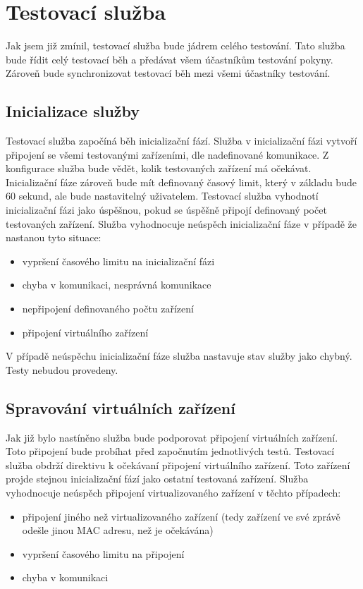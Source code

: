 \section{Testovací služba}
Jak jsem již zmínil, testovací služba bude jádrem celého testování. Tato služba bude řídit celý testovací běh a předávat všem účastníkům testování pokyny. Zároveň bude synchronizovat testovací běh mezi všemi účastníky testování. 

\subsection{Inicializace služby}
Testovací služba započíná běh inicializační fází. Služba v inicializační fázi vytvoří připojení se všemi testovanými zařízeními, dle nadefinované komunikace. Z konfigurace služba bude vědět, kolik testovaných zařízení má očekávat. Inicializační fáze zároveň bude mít definovaný časový limit, který v základu bude 60 sekund, ale bude nastavitelný uživatelem. Testovací služba vyhodnotí inicializační fázi jako úspěšnou, pokud se úspěšně připojí definovaný počet testovaných zařízení. Služba vyhodnocuje neúspěch inicializační fáze v případě že nastanou tyto situace:

\begin{itemize}
    \item vypršení časového limitu na inicializační fázi
    \item chyba v komunikaci, nesprávná komunikace
    \item nepřipojení definovaného počtu zařízení
    \item připojení virtuálního zařízení
\end{itemize}

V případě neúspěchu inicializační fáze služba nastavuje stav služby jako chybný. Testy nebudou provedeny.

\subsection{Spravování virtuálních zařízení}
Jak již bylo nastíněno služba bude podporovat připojení virtuálních zařízení. Toto připojení bude probíhat před započnutím jednotlivých testů. Testovací služba obdrží direktivu k očekávaní připojení virtuálního zařízení. Toto zařízení projde stejnou inicializační fází jako ostatní testovaná zařízení. Služba vyhodnocuje neúspěch připojení virtualizovaného zařízení v těchto případech:

\begin{itemize}
    \item připojení jiného než virtualizovaného zařízení (tedy zařízení ve své zprávě odešle jinou MAC adresu, než je očekávána)
    \item vypršení časového limitu na připojení
    \item chyba v komunikaci
\end{itemize}

